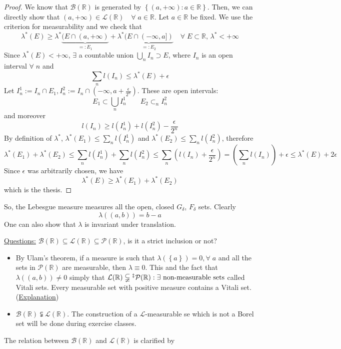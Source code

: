 \documentclass[a4paper,12pt]{article}
\theoremstyle{break}
\newcommand{\boreal}{\mathcal{B}(\mathbb{R})}
\newcommand{\real}{\mathbb{R}}
\numberwithin{equation}{section}
\begin{document}
\begin{proof}
    We know that \(\boreal\) is generated by \(\left\lbrace (a, +\infty) : a \in \real \right\rbrace\). Then, we can directly show that \((a, +\infty) \in \mathcal{L}(\real) \quad \forall \; a \in \real\). Let \(a \in \real\) be fixed. We use the criterion for measurability and we check that 
    \[
        \lambda^* (E) \geq \lambda^*\underbrace{(E \cap (a, +\infty)}_{=: E_1} + \lambda^*\underbrace{(E \cap (-\infty, a])}_{=:E_2} \quad \forall\; E \subset \real, \, \lambda^* < +\infty
    \]
    Since \(\lambda^*(E) < +\infty\), \(\exists\) a countable union \(\bigcup_n I_n \supset E\), where \(I_n\) is an open interval \(\forall \; n\) and 
    \[
        \sum_n l(I_n) \leq \lambda^*(E) + \epsilon
    \]
    Let \(I^1_n := I_n \cap E_1, I^2_n := I_n \cap (-\infty, a + \frac{\epsilon}{2^n})\). These are open intervals:
    \[
        E_1 \subset \bigcup_n I^1_n \qquad E_2 \subset_n I^2_n
    \tag*{countable unions}\]
    and moreover 
    \[
        l(I_n) \geq l(I^1_n) + l(I^2_n) - \frac{\epsilon}{2^n}
    \]
    By definition of \(\lambda^*\), \(\lambda^*(E_1) \leq \sum_n l(I^1_n)\) and \(\lambda^* (E_2) \leq \sum_n l(I^2_n)\), therefore 
    \[
        \lambda^*(E_1) + \lambda^*(E_2) \leq \sum_n l(I^1_n) + \sum_n l(I^2_n) \leq \sum_n \left(l(I_n) +\frac{\epsilon}{2^n}\right) = \left(\sum_n l(I_n)\right) + \epsilon \leq \lambda^*(E) + 2\epsilon
    \]
    Since \(\epsilon\) was arbitrarily chosen, we have
    \[
        \lambda^*(E) \geq \lambda^*(E_1) + \lambda^*(E_2)
    \]  
    which is the thesis.
\end{proof}
So, the Lebesgue measure measures all the open, closed \(G_{\delta}\), \(F_{\delta}\) sets. Clearly
\[
    \lambda((a,b)) = b-a
\]
One can also show that \(\lambda\) is invariant under translation. 

\underline{Questions:} \(\boreal \subseteq \mathcal{L}(\mathbb{R}) \subseteq \mathcal{P}(\real)\), is it a strict inclusion or not?
\begin{itemize}
    \item By Ulam's theorem, if a measure is such that \(\lambda \left(\left\{ a \right\}\right) = 0, \forall \; a\) and all the sets in \(\mathcal{P}(\real)\) are measurable, then \(\lambda \equiv 0\). This and the fact that \(\lambda\left(\left(a,b\right)\right) \not = 0\) simply that \(\mathcal{L}(\real) \subsetneqq\symbolfootnotemark[3]{I had no choice} \mathcal{P}(\real) : \exists \mbox{ non-measurable sets}\) called Vitali sets. Every measurable set with positive measure contains a Vitali set. (\href{https://math.stackexchange.com/questions/137949/the-construction-of-a-vitali-set}{Explanation})
    \item \(\boreal \subsetneqq \mathcal{L}(\real)\). The construction of a \(\mathcal{L}\)-measurable se which is not a Borel set will be done during exercise classes.
\end{itemize}
The relation between \(\boreal\) and \(\mathcal{L}(\real)\) is clarified by 
\end{document}
